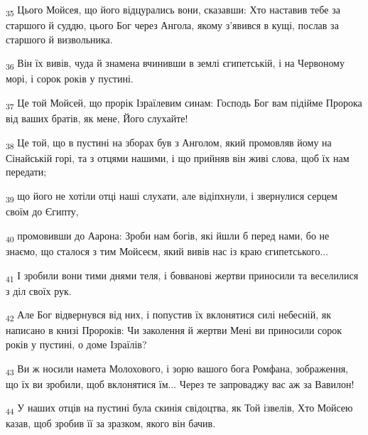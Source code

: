 \begin{tcolorbox}
\textsubscript{35} Цього Мойсея, що його відцурались вони, сказавши: Хто наставив тебе за старшого й суддю, цього Бог через Ангола, якому з'явився в кущі, послав за старшого й визвольника.
\end{tcolorbox}
\begin{tcolorbox}
\textsubscript{36} Він їх вивів, чуда й знамена вчинивши в землі єгипетській, і на Червоному морі, і сорок років у пустині.
\end{tcolorbox}
\begin{tcolorbox}
\textsubscript{37} Це той Мойсей, що прорік Ізраїлевим синам: Господь Бог вам підійме Пророка від ваших братів, як мене, Його слухайте!
\end{tcolorbox}
\begin{tcolorbox}
\textsubscript{38} Це той, що в пустині на зборах був з Анголом, який промовляв йому на Сінайській горі, та з отцями нашими, і що прийняв він живі слова, щоб їх нам передати;
\end{tcolorbox}
\begin{tcolorbox}
\textsubscript{39} що його не хотіли отці наші слухати, але відіпхнули, і звернулися серцем своїм до Єгипту,
\end{tcolorbox}
\begin{tcolorbox}
\textsubscript{40} промовивши до Аарона: Зроби нам богів, які йшли б перед нами, бо не знаємо, що сталося з тим Мойсеєм, який вивів нас із краю єгипетського...
\end{tcolorbox}
\begin{tcolorbox}
\textsubscript{41} І зробили вони тими днями теля, і бовванові жертви приносили та веселилися з діл своїх рук.
\end{tcolorbox}
\begin{tcolorbox}
\textsubscript{42} Але Бог відвернувся від них, і попустив їх вклонятися силі небесній, як написано в книзі Пророків: Чи заколення й жертви Мені ви приносили сорок років у пустині, о доме Ізраїлів?
\end{tcolorbox}
\begin{tcolorbox}
\textsubscript{43} Ви ж носили намета Молохового, і зорю вашого бога Ромфана, зображення, що їх ви зробили, щоб вклонятися їм... Через те запроваджу вас аж за Вавилон!
\end{tcolorbox}
\begin{tcolorbox}
\textsubscript{44} У наших отців на пустині була скинія свідоцтва, як Той ізвелів, Хто Мойсею казав, щоб зробив її за зразком, якого він бачив.
\end{tcolorbox}

